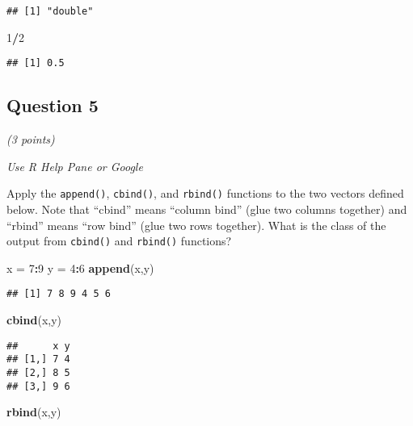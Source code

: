 \documentclass[
]{article}
\newenvironment{Shaded}{\begin{snugshade}}{\end{snugshade}}
\newcommand{\DecValTok}[1]{\textcolor[rgb]{0.00,0.00,0.81}{#1}}
\newcommand{\KeywordTok}[1]{\textcolor[rgb]{0.13,0.29,0.53}{\textbf{#1}}}
\newcommand{\NormalTok}[1]{#1}
\newcommand{\OperatorTok}[1]{\textcolor[rgb]{0.81,0.36,0.00}{\textbf{#1}}}
\newcommand{\StringTok}[1]{\textcolor[rgb]{0.31,0.60,0.02}{#1}}
\begin{document}
\begin{verbatim}
## [1] "double"
\end{verbatim}

\begin{Shaded}
\begin{Highlighting}[]
\DecValTok{1}\OperatorTok{/}\DecValTok{2}
\end{Highlighting}
\end{Shaded}

\begin{verbatim}
## [1] 0.5
\end{verbatim}

\hypertarget{question-5}{%
\subsection{Question 5}\label{question-5}}

\emph{(3 points)}

\emph{Use R Help Pane or Google}

Apply the \texttt{append()}, \texttt{cbind()}, and \texttt{rbind()}
functions to the two vectors defined below. Note that ``cbind'' means
``column bind'' (glue two columns together) and ``rbind'' means ``row
bind'' (glue two rows together). What is the class of the output from
\texttt{cbind()} and \texttt{rbind()} functions?

\begin{Shaded}
\begin{Highlighting}[]
\NormalTok{x =}\StringTok{ }\DecValTok{7}\OperatorTok{:}\DecValTok{9}
\NormalTok{y =}\StringTok{ }\DecValTok{4}\OperatorTok{:}\DecValTok{6}
\KeywordTok{append}\NormalTok{(x,y)}
\end{Highlighting}
\end{Shaded}

\begin{verbatim}
## [1] 7 8 9 4 5 6
\end{verbatim}

\begin{Shaded}
\begin{Highlighting}[]
\KeywordTok{cbind}\NormalTok{(x,y)}
\end{Highlighting}
\end{Shaded}

\begin{verbatim}
##      x y
## [1,] 7 4
## [2,] 8 5
## [3,] 9 6
\end{verbatim}

\begin{Shaded}
\begin{Highlighting}[]
\KeywordTok{rbind}\NormalTok{(x,y)}
\end{Highlighting}
\end{Shaded}
\end{document}
